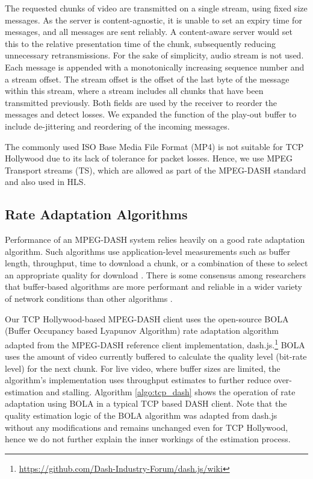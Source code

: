 The requested chunks of video are transmitted on a single stream, using fixed size
messages. As the server is content-agnostic, it is unable to set an expiry time for messages, and
all messages are sent reliably. A content-aware server would set this to the relative presentation time of the chunk, subsequently reducing unnecessary retransmissions. For the sake of simplicity, audio stream is not used. Each message is appended with a monotonically increasing sequence number and a stream offset. The stream offset is the offset of the last byte of the message within this stream, where a stream includes all chunks that have been transmitted
previously. Both fields are used by the receiver to reorder the messages and detect
losses. We expanded the function of the play-out buffer to include de-jittering and
reordering of the incoming messages.

The commonly used ISO Base Media File Format (MP4) is not suitable for TCP Hollywood due to its lack of tolerance for packet losses. Hence, we use MPEG Transport streams (TS), which are allowed as part of the MPEG-DASH standard and also used in HLS.

\subsection{Rate Adaptation Algorithms}

Performance of an MPEG-DASH system relies heavily on a good rate adaptation algorithm.
Such algorithms use application-level measurements such as buffer length, throughput, time to
download a chunk, or a combination of these to select an appropriate quality for
download \cite{beben2016abma+, spiteri2016bola, li2014probe}. There is some consensus
among researchers that buffer-based algorithms are more performant and reliable in a wider
variety of network conditions than other algorithms 
\cite{huang2015buffer, karagkioules2017comparative}.

Our TCP Hollywood-based MPEG-DASH client uses the open-source BOLA 
(Buffer Occupancy based Lyapunov Algorithm) rate adaptation algorithm \cite{spiteri2016bola} adapted from the MPEG-DASH reference
client implementation, dash.js.\footnote{\url{https://github.com/Dash-Industry-Forum/dash.js/wiki}}
BOLA uses the amount of video currently buffered to calculate the quality level (bit-rate
level) for the next chunk. For live video, where buffer sizes are limited, the algorithm's implementation 
uses throughput estimates to further reduce over-estimation and stalling. Algorithm \ref{algo:tcp_dash} shows the operation of rate adaptation using BOLA in a typical TCP based DASH client. Note that the quality estimation logic of the BOLA algorithm was adapted from dash.js without any modifications and remains unchanged even for TCP Hollywood, hence we do not further explain the inner workings of the estimation process. 


